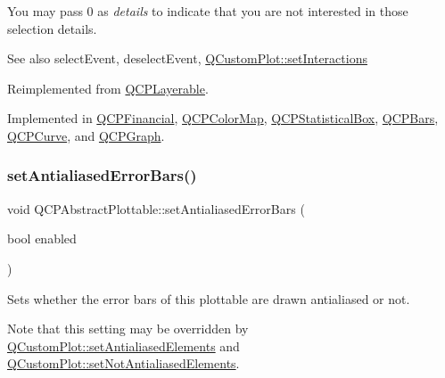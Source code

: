You may pass 0 as {\itshape details} to indicate that you are not interested in those selection details.

\begin{DoxySeeAlso}{See also}
select\+Event, deselect\+Event, \mbox{\hyperlink{class_q_custom_plot_a5ee1e2f6ae27419deca53e75907c27e5}{Q\+Custom\+Plot\+::set\+Interactions}} 
\end{DoxySeeAlso}


Reimplemented from \mbox{\hyperlink{class_q_c_p_layerable_a04db8351fefd44cfdb77958e75c6288e}{Q\+C\+P\+Layerable}}.



Implemented in \mbox{\hyperlink{class_q_c_p_financial_a77bffad8f3fcbcccbef03ead1c538e3a}{Q\+C\+P\+Financial}}, \mbox{\hyperlink{class_q_c_p_color_map_aba91ea58b489031157ecb777fe79e309}{Q\+C\+P\+Color\+Map}}, \mbox{\hyperlink{class_q_c_p_statistical_box_a0153ac16326b94450afbca208e3f9961}{Q\+C\+P\+Statistical\+Box}}, \mbox{\hyperlink{class_q_c_p_bars_a62d66cc8eedca6bedfc1f6513164d418}{Q\+C\+P\+Bars}}, \mbox{\hyperlink{class_q_c_p_curve_a87a9fb34a2a48dcae4c1245ada235e7d}{Q\+C\+P\+Curve}}, and \mbox{\hyperlink{class_q_c_p_graph_a36011c34aca4f7a477de25961e2f6c13}{Q\+C\+P\+Graph}}.

\mbox{\label{class_q_c_p_abstract_plottable_a757beb744b96cf1855cca5ab9d3ecf52}} 
\subsubsection{\texorpdfstring{set\+Antialiased\+Error\+Bars()}{setAntialiasedErrorBars()}}
{\footnotesize\ttfamily void Q\+C\+P\+Abstract\+Plottable\+::set\+Antialiased\+Error\+Bars (\begin{DoxyParamCaption}\item[{bool}]{enabled }\end{DoxyParamCaption})}

Sets whether the error bars of this plottable are drawn antialiased or not.

Note that this setting may be overridden by \mbox{\hyperlink{class_q_custom_plot_af6f91e5eab1be85f67c556e98c3745e8}{Q\+Custom\+Plot\+::set\+Antialiased\+Elements}} and \mbox{\hyperlink{class_q_custom_plot_ae10d685b5eabea2999fb8775ca173c24}{Q\+Custom\+Plot\+::set\+Not\+Antialiased\+Elements}}. \mbox{\label{class_q_c_p_abstract_plottable_a089d6b5577120239b55c39ed27c39536}} 
